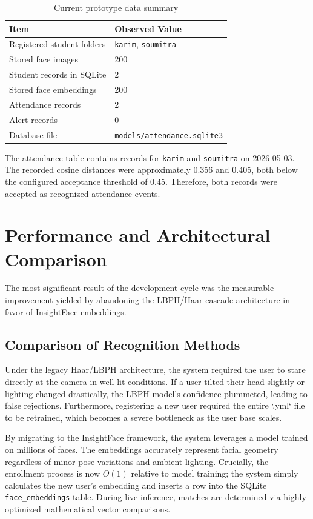 \documentclass[12pt,a4paper]{report}
\newcommand{\JustifiedNormal}{\fontsize{12}{14}\selectfont\justifying\setlength{\parindent}{0pt}}
\begin{document}
\begin{table}[H]
\centering
\caption{Current prototype data summary}
\begin{tabular}{|l|l|}
\hline
\textbf{Item} & \textbf{Observed Value}\\
\hline
Registered student folders & \texttt{karim}, \texttt{soumitra}\\
\hline
Stored face images & 200\\
\hline
Student records in SQLite & 2\\
\hline
Stored face embeddings & 200\\
\hline
Attendance records & 2\\
\hline
Alert records & 0\\
\hline
Database file & \texttt{models/attendance.sqlite3}\\
\hline
\end{tabular}
\end{table}

The attendance table contains records for \texttt{karim} and \texttt{soumitra} on 2026-05-03. The recorded cosine distances were approximately 0.356 and 0.405, both below the configured acceptance threshold of 0.45. Therefore, both records were accepted as recognized attendance events.

\section{Performance and Architectural Comparison}
\JustifiedNormal
The most significant result of the development cycle was the measurable improvement yielded by abandoning the LBPH/Haar cascade architecture in favor of InsightFace embeddings.

\subsection{Comparison of Recognition Methods}
\JustifiedNormal
Under the legacy Haar/LBPH architecture, the system required the user to stare directly at the camera in well-lit conditions. If a user tilted their head slightly or lighting changed drastically, the LBPH model's confidence plummeted, leading to false rejections. Furthermore, registering a new user required the entire `.yml` file to be retrained, which becomes a severe bottleneck as the user base scales.

By migrating to the InsightFace framework, the system leverages a model trained on millions of faces. The embeddings accurately represent facial geometry regardless of minor pose variations and ambient lighting. Crucially, the enrollment process is now $O(1)$ relative to model training; the system simply calculates the new user's embedding and inserts a row into the SQLite \texttt{face\_embeddings} table. During live inference, matches are determined via highly optimized mathematical vector comparisons.
\end{document}
